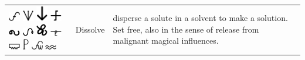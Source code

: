 \documentclass[british,final,landscape]{scrartcl}
\begin{document}
\begin{refsection}
\begin{supertabular}{p{0.3\textwidth}p{0.34\textwidth}p{0.34\textwidth}}
   \includegraphics[width=5mm]{Process/Dissolve}   \includegraphics[width=5mm]{Process/Dissolve2}  \includegraphics[width=5mm]{Process/Dissolve3} \includegraphics[width=5mm]{Process/Dissolve4}  \includegraphics[width=5mm]{Process/Dissolve5}  \includegraphics[width=5mm]{Process/Dissolve6} \includegraphics[width=5mm]{Process/Dissolve7}  \includegraphics[width=5mm]{Process/Dissolve8}  \includegraphics[width=5mm]{Process/Dissolve9} \includegraphics[height=5mm]{Process/Dissolve10} \includegraphics[width=5mm]{Process/Dissolve11} \includegraphics[width=5mm]{Astrology/Aquarius} & Dissolve & disperse a solute in a solvent to make a solution. Set free, also in the sense of release from malignant magical influences. \\

\end{supertabular}
\end{refsection}
\end{document}

